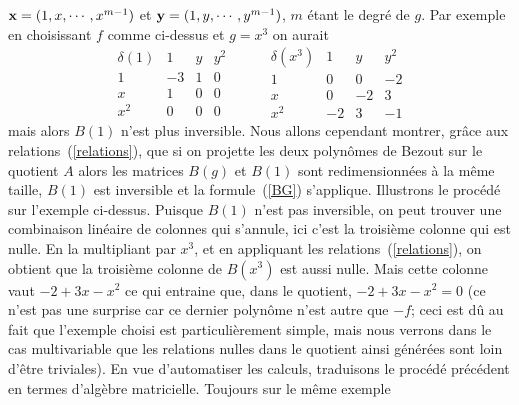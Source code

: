 \documentclass{standalone}
\begin{document}
$\bold{x} = (1, x,\cdots, x^{m-1})$ et $\bold{y} = (1, y,\cdots, y^{m-1})$, $m$ étant le degré de $g$. Par exemple en choisissant $f$ comme ci-dessus et $g = x^3$ on aurait
$$
\begin{array}{c|ccc}
\delta(1) & 1 & y & y^2\\
\hline
1 & -3 & 1 & 0\\
x & 1 & 0 & 0\\
x^2 & 0 & 0 & 0
\end{array}
\hspace{1cm}
\begin{array}{c|ccc}
\delta(x^3) & 1 & y & y^2\\
\hline
1 & 0 & 0 & -2\\
x & 0 & -2 & 3\\
x^2 & -2 & 3 & -1
\end{array}
$$
mais alors $B(1)$ n'est plus inversible. Nous allons cependant montrer, grâce aux relations~(\ref{relations}), que si on projette les deux polynômes de Bezout sur le quotient $A$ alors les matrices $B(g)$ et $B(1)$ sont redimensionnées à la même taille, $B(1)$ est inversible et la formule~(\ref{BG}) s'applique. Illustrons le procédé sur l'exemple ci-dessus. Puisque $B(1)$ n'est pas inversible, on peut trouver une combinaison linéaire de colonnes qui s'annule, ici c'est la troisième colonne qui est nulle. En la multipliant par $x^3$, et en appliquant les relations~(\ref{relations}), on obtient que la troisième colonne de $B(x^3)$ est aussi nulle. Mais cette colonne vaut $-2 + 3x - x^2$ ce qui entraine que, dans le quotient,
$-2 + 3x - x^2 = 0$ (ce n'est pas une surprise car ce dernier polynôme n'est autre que $-f$; ceci est dû au fait que l'exemple choisi est particulièrement simple, mais nous verrons dans le cas multivariable que les relations nulles dans le quotient ainsi générées sont loin d'être triviales). En vue d'automatiser les calculs, traduisons le procédé précédent en termes d'algèbre matricielle.
Toujours sur le même exemple
\end{document}
